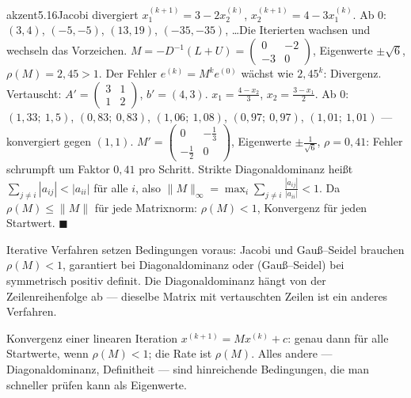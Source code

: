 \begin{loesungkarte}{akzent}{5.16}{Jacobi divergiert}
$x_1^{(k+1)} = 3 - 2x_2^{(k)}$, $x_2^{(k+1)} = 4 - 3x_1^{(k)}$. Ab $0$: $(3, 4)$, $(-5, -5)$, $(13, 19)$, $(-35, -35)$, \dots Die Iterierten wachsen und wechseln das Vorzeichen.
$M = -D^{-1}(L + U) = \begin{pmatrix}0 & -2\\ -3 & 0\end{pmatrix}$, Eigenwerte $\pm\sqrt6$, $\rho(M) = 2{,}45 > 1$. Der Fehler $e^{(k)} = M^{k}e^{(0)}$ wächst wie $2{,}45^{k}$: Divergenz.
Vertauscht: $A' = \begin{pmatrix}3 & 1\\ 1 & 2\end{pmatrix}$, $b' = (4, 3)$. $x_1 = \frac{4 - x_2}3$, $x_2 = \frac{3 - x_1}2$. Ab $0$: $(1{,}33;\ 1{,}5)$, $(0{,}83;\ 0{,}83)$, $(1{,}06;\ 1{,}08)$, $(0{,}97;\ 0{,}97)$, $(1{,}01;\ 1{,}01)$ --- konvergiert gegen $(1, 1)$. $M' = \begin{pmatrix}0 & -\frac13\\ -\frac12 & 0\end{pmatrix}$, Eigenwerte $\pm\frac1{\sqrt6}$, $\rho = 0{,}41$: Fehler schrumpft um Faktor $0{,}41$ pro Schritt.
Strikte Diagonaldominanz heißt $\sum_{j\neq i}|a_{ij}| < |a_{ii}|$ für alle $i$, also $\|M\|_\infty = \max_i\sum_{j\neq i}\frac{|a_{ij}|}{|a_{ii}|} < 1$. Da $\rho(M)\le\|M\|$ für jede Matrixnorm: $\rho(M) < 1$, Konvergenz für jeden Startwert. $\blacksquare$
\begin{fehler}\kastentext
Iterative Verfahren setzen Bedingungen voraus: Jacobi und Gauß--Seidel brauchen $\rho(M) < 1$, garantiert bei Diagonaldominanz oder (Gauß--Seidel) bei symmetrisch positiv definit. Die Diagonaldominanz hängt von der Zeilenreihenfolge ab --- dieselbe Matrix mit vertauschten Zeilen ist ein anderes Verfahren.
\end{fehler}
\begin{mitnehmen}\kastentext
Konvergenz einer linearen Iteration $x^{(k+1)} = Mx^{(k)} + c$: genau dann für alle Startwerte, wenn $\rho(M) < 1$; die Rate ist $\rho(M)$. Alles andere --- Diagonaldominanz, Definitheit --- sind hinreichende Bedingungen, die man schneller prüfen kann als Eigenwerte.
\end{mitnehmen}
\end{loesungkarte}

